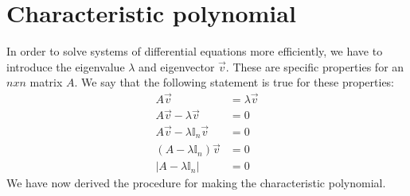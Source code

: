 \documentclass[]{subfiles}
\begin{document}
	\section{Characteristic polynomial}
	In order to solve systems of differential equations more efficiently, we have to introduce the eigenvalue $\lambda$ and eigenvector $\vec{v}$.  These are specific properties for an $n x n$ matrix $A$. We say that the following statement is true for these properties:
	\begin{align*}
		A\vec{v}&=\lambda\vec{v}\\
		A\vec{v}-\lambda\vec{v}&=0\\
		A\vec{v}-\lambda\mathbb{I}_n\vec{v}&=0\\
		(A-\lambda\mathbb{I}_n)\vec{v}&=0\\
		|A-\lambda\mathbb{I}_n|&=0
	\end{align*}
	We have now derived the procedure for making the characteristic polynomial.
\end{document}
